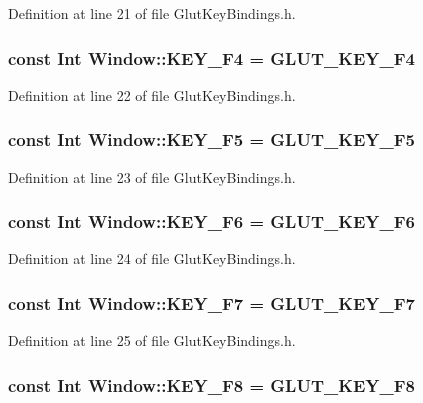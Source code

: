Definition at line 21 of file Glut\-Key\-Bindings.h.
\subsubsection{\setlength{\rightskip}{0pt plus 5cm}const {\bf Int} Window::KEY\_\-F4 = GLUT\_\-KEY\_\-F4\hspace{0.3cm}{\tt  [static]}}\label{classdg_1_1Window_p14}




Definition at line 22 of file Glut\-Key\-Bindings.h.
\subsubsection{\setlength{\rightskip}{0pt plus 5cm}const {\bf Int} Window::KEY\_\-F5 = GLUT\_\-KEY\_\-F5\hspace{0.3cm}{\tt  [static]}}\label{classdg_1_1Window_p15}




Definition at line 23 of file Glut\-Key\-Bindings.h.
\subsubsection{\setlength{\rightskip}{0pt plus 5cm}const {\bf Int} Window::KEY\_\-F6 = GLUT\_\-KEY\_\-F6\hspace{0.3cm}{\tt  [static]}}\label{classdg_1_1Window_p16}




Definition at line 24 of file Glut\-Key\-Bindings.h.
\subsubsection{\setlength{\rightskip}{0pt plus 5cm}const {\bf Int} Window::KEY\_\-F7 = GLUT\_\-KEY\_\-F7\hspace{0.3cm}{\tt  [static]}}\label{classdg_1_1Window_p17}




Definition at line 25 of file Glut\-Key\-Bindings.h.
\subsubsection{\setlength{\rightskip}{0pt plus 5cm}const {\bf Int} Window::KEY\_\-F8 = GLUT\_\-KEY\_\-F8\hspace{0.3cm}{\tt  [static]}}\label{classdg_1_1Window_p18}




